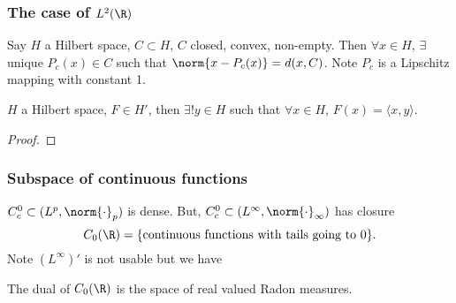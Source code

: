 \documentclass[twoside]{article}
\begin{document}
\subsubsection*{The case of $L^2(\R)$}
\begin{prop}
    Say $H$ a Hilbert space, $C \subset H$, $C$ closed, convex, non-empty.
    Then $\forall x \in H$, $\exists$ unique $P_c(x) \in C$ such that $\norm{x - P_c(x)} = d(x, C)$.
    Note $P_c$ is a Lipschitz mapping with constant 1.
\end{prop}
\begin{thm}
    $H$ a Hilbert space, $F \in H'$, then $\exists ! y \in H$ such that $\forall x \in H$, $F(x) = \langle x , y\rangle$.
\end{thm}
\begin{proof}
\end{proof}
\subsubsection*{Subspace of continuous functions}
$C_c^0 \subset (L^p, \norm{\cdot}_p)$ is dense.  But, $C_c^0 \subset (L^\infty, \norm{\cdot}_\infty)$ has closure
\begin{equation*}
    C_0(\R) = \{ \text{continuous functions with tails going to 0}\}.
\end{equation*}
Note $(L^\infty)'$ is not usable but we have
\begin{thm}
    The dual of $C_0(\R)$ is the space of real valued Radon measures.
\end{thm}
\end{document}
